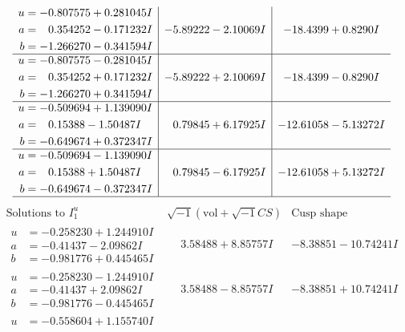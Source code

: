 \documentclass[1p]{elsarticle_modified}
\theoremstyle{definition}
\newcommand{\I}{\sqrt{-1}}
\begin{document}
$$\begin{array}{c|c|c}
\begin{aligned}
u &= -0.807575 + 0.281045 I \\
a &= \phantom{-}0.354252 - 0.171232 I \\
b &= -1.266270 - 0.341594 I\end{aligned}
 & -5.89222 - 2.10069 I & -18.4399 + 0.8290 I \\ \hline\begin{aligned}
u &= -0.807575 - 0.281045 I \\
a &= \phantom{-}0.354252 + 0.171232 I \\
b &= -1.266270 + 0.341594 I\end{aligned}
 & -5.89222 + 2.10069 I & -18.4399 - 0.8290 I \\ \hline\begin{aligned}
u &= -0.509694 + 1.139090 I \\
a &= \phantom{-}0.15388 - 1.50487 I \\
b &= -0.649674 + 0.372347 I\end{aligned}
 & \phantom{-}0.79845 + 6.17925 I & -12.61058 - 5.13272 I \\ \hline\begin{aligned}
u &= -0.509694 - 1.139090 I \\
a &= \phantom{-}0.15388 + 1.50487 I \\
b &= -0.649674 - 0.372347 I\end{aligned}
 & \phantom{-}0.79845 - 6.17925 I & -12.61058 + 5.13272 I\\
 \hline 
 \end{array}$$\newpage$$\begin{array}{c|c|c}  
\text{Solutions to }I^u_{1}& \I (\text{vol} + \sqrt{-1}CS) & \text{Cusp shape}\\
 \hline 
\begin{aligned}
u &= -0.258230 + 1.244910 I \\
a &= -0.41437 - 2.09862 I \\
b &= -0.981776 + 0.445465 I\end{aligned}
 & \phantom{-}3.58488 + 8.85757 I & -8.38851 - 10.74241 I \\ \hline\begin{aligned}
u &= -0.258230 - 1.244910 I \\
a &= -0.41437 + 2.09862 I \\
b &= -0.981776 - 0.445465 I\end{aligned}
 & \phantom{-}3.58488 - 8.85757 I & -8.38851 + 10.74241 I \\ \hline\begin{aligned}
u &= -0.558604 + 1.155740 I \\

\end{aligned}
\end{array}$$
\end{document}
